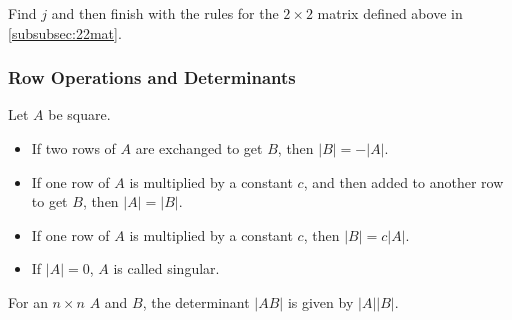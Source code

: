 \documentclass[12pt, landscape, twocolumn]{article}
\begin{document}
        Find $j$ and then finish with the rules for the $2 \times 2$ matrix defined above in \eqref{subsubsec:22mat}.

        \subsubsection{Row Operations and Determinants}
        Let $A$ be square.

        \begin{itemize}
        \item If two rows of $A$ are exchanged to get $B$, then $|B| = -|A|$.
        \item If one row of $A$ is multiplied by a constant $c$, and then added to another row to get $B$, then $|A| = |B|$.
        \item If one row of $A$ is multiplied by a constant $c$, then $|B| = c|A|$.
        \item If $|A| = 0$, $A$ is called singular.
        \end{itemize}

        For an $n \times n$ $A$ and $B$, the determinant $|AB|$ is given by $|A||B|$.
\end{document}
